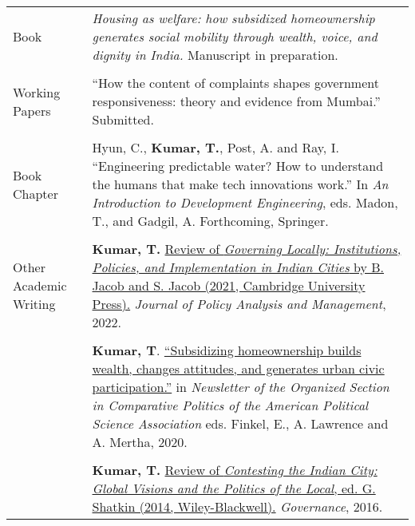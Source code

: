 \documentclass[letterpaper, 10pt]{article}
\begin{document}
\begin{longtable}{p{1.5in}p{5in}}
{{Book}} 
& \textit{Housing as welfare: how subsidized homeownership generates social mobility through wealth, voice, and dignity in India.} Manuscript in preparation. \\
& \\


{{Working Papers}} 


& ``How the content of complaints shapes government responsiveness: theory and evidence from Mumbai.'' Submitted. \\
& \\


{{Book Chapter}} 
& Hyun, C., \textbf{Kumar, T.}, Post, A. and Ray, I. ``Engineering predictable water? How to understand the humans that make tech innovations work.'' In \textit{An Introduction to Development Engineering}, eds. Madon, T., and Gadgil, A. Forthcoming, Springer.\\

& \\

{{Other Academic Writing}} 



& \textbf{Kumar, T.} \href{https://doi.org/10.1002/pam.22390}{Review of \textit{Governing Locally: Institutions, Policies, and Implementation in Indian Cities} by B. Jacob and S. Jacob (2021, Cambridge University Press).}  \textit{Journal of Policy Analysis and Management}, 2022. \\


& \\


& \textbf{Kumar, T}.
 \href{https://www.comparativepoliticsnewsletter.org/wp-content/uploads/2020/05/Spring-Newsletter-2020.pdf}{``Subsidizing homeownership builds wealth, changes attitudes, and generates urban civic participation.''} in \textit{Newsletter of the Organized Section in Comparative Politics of the American Political Science Association} eds. Finkel, E., A. Lawrence and A. Mertha, 2020. \\
&\\
& \textbf{Kumar, T.} \href{http://onlinelibrary.wiley.com/doi/10.1111/gove.12241/abstract}{Review of \textit{Contesting the Indian City: Global Visions and the Politics of the Local}, ed. G. Shatkin (2014, Wiley-Blackwell).} \textit{Governance}, 2016. 


\end{longtable}
\end{document}
